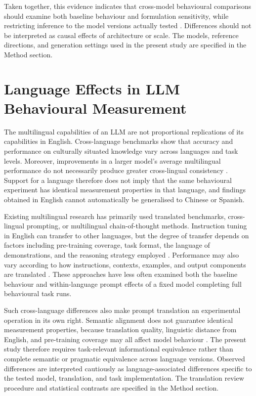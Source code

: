 \documentclass[logo,msc]{infthesis}
\begin{document}
Taken together, this evidence indicates that cross-model behavioural comparisons should examine both baseline behaviour and formulation sensitivity, while restricting inference to the model versions actually tested \cite{Chen2024ChatGPTBehavior,Palmer2024ProprietaryModels}. Differences should not be interpreted as causal effects of architecture or scale. The models, reference directions, and generation settings used in the present study are specified in the Method section.

\section{Language Effects in LLM Behavioural Measurement}

The multilingual capabilities of an LLM are not proportional replications of its capabilities in English. Cross-language benchmarks show that accuracy and performance on culturally situated knowledge vary across languages and task levels. Moreover, improvements in a larger model's average multilingual performance do not necessarily produce greater cross-lingual consistency \cite{Zhang2023M3Exam,Qi2023CrossLingualConsistency}. Support for a language therefore does not imply that the same behavioural experiment has identical measurement properties in that language, and findings obtained in English cannot automatically be generalised to Chinese or Spanish.

Existing multilingual research has primarily used translated benchmarks, cross-lingual prompting, or multilingual chain-of-thought methods. Instruction tuning in English can transfer to other languages, but the degree of transfer depends on factors including pre-training coverage, task format, the language of demonstrations, and the reasoning strategy employed \cite{Muennighoff2023CrosslingualGeneralization,Shi2023MultilingualCoT}. Performance may also vary according to how instructions, contexts, examples, and output components are translated \cite{Mondshine2025BeyondEnglish}. These approaches have less often examined both the baseline behaviour and within-language prompt effects of a fixed model completing full behavioural task runs.

Such cross-language differences also make prompt translation an experimental operation in its own right. Semantic alignment does not guarantee identical measurement properties, because translation quality, linguistic distance from English, and pre-training coverage may all affect model behaviour \cite{Mondshine2025BeyondEnglish}. The present study therefore requires task-relevant informational equivalence rather than complete semantic or pragmatic equivalence across language versions. Observed differences are interpreted cautiously as language-associated differences specific to the tested model, translation, and task implementation. The translation review procedure and statistical contrasts are specified in the Method section.
\end{document}
